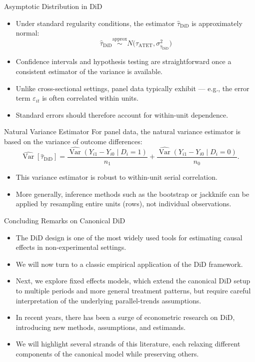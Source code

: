 \documentclass[11pt,aspectratio=169]{beamer}
\DeclareMathOperator{\Var}{Var}
\begin{document}
\begin{frame}{Asymptotic Distribution in DiD}
\begin{itemize}
  \item Under standard regularity conditions, the estimator $\widehat\tau_{\text{DiD}}$ is approximately normal:
  \[\widehat\tau_{\text{DiD}}\overset{\text{approx}}{\sim}N\bigl(\tau_{\text{ATET}},\sigma^2_{\widehat\tau_{\text{DiD}}}\bigr)\]
  \item Confidence intervals and hypothesis testing are straightforward once a consistent estimator of the variance is available.
  \item Unlike cross-sectional settings, panel data typically exhibit  --- e.g., the error term $\varepsilon_{it}$ is often correlated within units.
  \item Standard errors should therefore account for within-unit dependence.
\end{itemize}
\end{frame}

\begin{frame}{Natural Variance Estimator}
For panel data, the natural variance estimator is based on the variance of outcome differences:
\[
  \widehat{\Var}[\widehat\tau_{\text{DiD}}]
  =\frac{\widehat{\Var}(Y_{i1}-Y_{i0}\mid D_i=1)}{n_1}
  +\frac{\widehat{\Var}(Y_{i1}-Y_{i0}\mid D_i=0)}{n_0}.
\]
\begin{itemize}
  \item This variance estimator is robust to within-unit serial correlation.
  \item More generally, inference methods such as the bootstrap or jackknife can be applied by resampling entire units (rows), not individual observations.
\end{itemize}
\end{frame}

\begin{frame}{Concluding Remarks on Canonical DiD}
\begin{itemize}
  \item The DiD design is one of the most widely used tools for estimating causal effects in non-experimental settings.
  \item We will now turn to a classic empirical application of the DiD framework.
  \item Next, we explore fixed effects models, which extend the canonical DiD setup to multiple periods and more general treatment patterns, but require careful interpretation of the underlying parallel-trends assumptions.
  \item In recent years, there has been a surge of econometric research on DiD, introducing new methods, assumptions, and estimands.
  \item We will highlight several strands of this literature, each relaxing different components of the canonical model while preserving others.
\end{itemize}
\end{frame}
\end{document}
